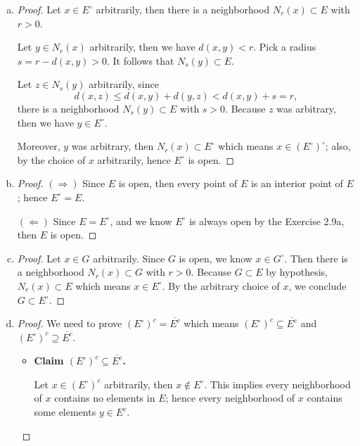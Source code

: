 \begin{Exercise}
	\begin{enumerate}[a)]
		\item
		\begin{proof}
			Let $x\in E^{\circ}$ arbitrarily, then there is a neighborhood $N_r(x)\subset E$ with $r>0$.
			
			Let $y\in N_r(x)$ arbitrarily, then we have $d(x,y)<r$. 
			Pick a radius $s=r-d(x,y)>0$. It follows that $N_s(y)\subset E$. 
			
			Let $z\in N_s(y)$ arbitrarily, since
			$$
			d(x,z) \leq d(x,y)+d(y,z) < d(x,y) + s = r,
			$$
			there is a neighborhood $N_s(y)\subset E$ with $s>0$. 
			Because $z$ was arbitrary, then we have $y\in E^{\circ}$.
			
			Moreover, $y$ was arbitrary, then $N_r(x)\subset E^{\circ}$ which means $x\in (E^{\circ})^{\circ}$; also, by the choice of $x$ arbitrarily, hence $E^{\circ}$ is open.
		\end{proof}
		
		\item
		\begin{proof}
			$(\Longrightarrow)$
			Since $E$ is open, then every point of $E$ is an interior point of $E$; hence $E^{\circ} = E$.
			
			$(\Longleftarrow)$
			Since $E = E^{\circ}$, and we know $E^{\circ}$ is always open by the Exercise 2.9a, then $E$ is open.
		\end{proof}
		
		\item
		\begin{proof}
			Let $x\in G$ arbitrarily. 
			Since $G$ is open, we know $x\in G^{\circ}$. 
			Then there is a neighborhood $N_r(x)\subset G$ with $r>0$. 
			Because $G\subset E$ by hypothesis, $N_r(x)\subset E$ which means $x\in E^{\circ}$. 
			By the arbitrary choice of $x$, we conclude $G\subset E^{\circ}$.
		\end{proof}
		
		\item
		\begin{proof}
			We need to prove $(E^{\circ})^c = \overline{E^c}$ which means $(E^{\circ})^c \subseteq \overline{E^c}$ and $(E^{\circ})^c \supseteq \overline{E^c}$.
			
			\begin{itemize}
				\item \textbf{Claim $(E^{\circ})^c \subseteq \overline{E^c}$.}
				
				Let $x\in(E^{\circ})^c$ arbitrarily, then $x\notin E^{\circ}$.
				This implies every neighborhood of $x$ contains no elements in $E$; hence every neighborhood of $x$ contains some elements $y\in E^c$.
				

\end{itemize}
\end{proof}
\end{enumerate}
\end{Exercise}
